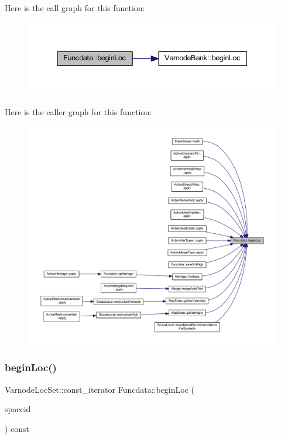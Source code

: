 Here is the call graph for this function\+:
\nopagebreak
\begin{figure}[H]
\begin{center}
\leavevmode
\includegraphics[width=338pt]{class_funcdata_ac34a257742ad827bd278d0b35e15af74_cgraph}
\end{center}
\end{figure}
Here is the caller graph for this function\+:
\nopagebreak
\begin{figure}[H]
\begin{center}
\leavevmode
\includegraphics[width=350pt]{class_funcdata_ac34a257742ad827bd278d0b35e15af74_icgraph}
\end{center}
\end{figure}
\mbox{\label{class_funcdata_a6d8fa3ac2bdccfd83dd3eba870ef3b09}} 
\subsubsection{\texorpdfstring{beginLoc()}{beginLoc()}\hspace{0.1cm}{\footnotesize\ttfamily [2/6]}}
{\footnotesize\ttfamily Varnode\+Loc\+Set\+::const\+\_\+iterator Funcdata\+::begin\+Loc (\begin{DoxyParamCaption}\item[{\mbox{\hyperlink{class_addr_space}{Addr\+Space}} $\ast$}]{spaceid }\end{DoxyParamCaption}) const\hspace{0.3cm}{\ttfamily [inline]}}



